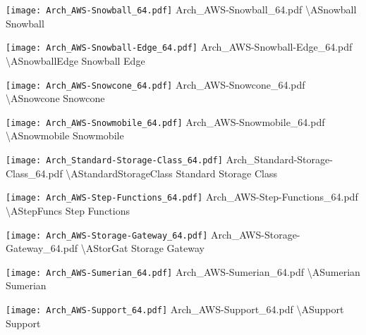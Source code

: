  {\texttt{[image: Arch\_AWS-Snowball\_64.pdf]}} {Arch\_AWS-Snowball\_64.pdf} {{\textbackslash}ASnowball} {Snowball}

 {\texttt{[image: Arch\_AWS-Snowball-Edge\_64.pdf]}} {Arch\_AWS-Snowball-Edge\_64.pdf} {{\textbackslash}ASnowballEdge} {Snowball Edge}

 {\texttt{[image: Arch\_AWS-Snowcone\_64.pdf]}} {Arch\_AWS-Snowcone\_64.pdf} {{\textbackslash}ASnowcone} {Snowcone}

 {\texttt{[image: Arch\_AWS-Snowmobile\_64.pdf]}} {Arch\_AWS-Snowmobile\_64.pdf} {{\textbackslash}ASnowmobile} {Snowmobile}

 {\texttt{[image: Arch\_Standard-Storage-Class\_64.pdf]}} {Arch\_Standard-Storage-Class\_64.pdf} {{\textbackslash}AStandardStorageClass} {Standard Storage Class}

 {\texttt{[image: Arch\_AWS-Step-Functions\_64.pdf]}} {Arch\_AWS-Step-Functions\_64.pdf} {{\textbackslash}AStepFuncs} {Step Functions}

 {\texttt{[image: Arch\_AWS-Storage-Gateway\_64.pdf]}} {Arch\_AWS-Storage-Gateway\_64.pdf} {{\textbackslash}AStorGat} {Storage Gateway}

 {\texttt{[image: Arch\_AWS-Sumerian\_64.pdf]}} {Arch\_AWS-Sumerian\_64.pdf} {{\textbackslash}ASumerian} {Sumerian}

 {\texttt{[image: Arch\_AWS-Support\_64.pdf]}} {Arch\_AWS-Support\_64.pdf} {{\textbackslash}ASupport} {Support}

